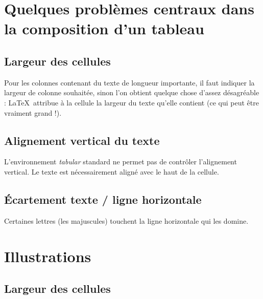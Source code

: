 




\section{Quelques problèmes centraux dans la composition d'un tableau}

\vfill

\subsection{Largeur des cellules}

Pour les colonnes contenant du texte de longueur importante, il faut
indiquer la largeur de colonne souhaitée, sinon l'on obtient quelque
chose d'assez désagréable : \LaTeX\ attribue à la cellule la largeur
du texte qu'elle contient (ce qui peut être vraiment grand !).

\subsection{Alignement vertical du texte}

L'environnement \emph{tabular} standard ne permet pas de contrôler
l'alignement vertical. Le texte est nécessairement aligné avec le haut
de la cellule.

\subsection{\'Ecartement texte / ligne horizontale}

Certaines lettres (les majuscules) touchent la ligne horizontale qui les domine.

\vfill


\section{Illustrations}

\subsection{Largeur des cellules}

